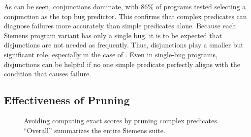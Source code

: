 As can be seen, conjunctions dominate, with 86\% of programs tested selecting a conjunction as the top bug predictor.  This confirms that complex predicates can diagnose failures more accurately than simple predicates alone.  Because each Siemens program variant has only a single bug, it is to be expected that disjunctions are not needed as frequently.  Thus, disjunctions play a smaller but significant role, especially in the case of .  Even in single-bug programs, disjunctions can be helpful if no one simple predicate perfectly aligns with the condition that causes failure.

\subsection{Effectiveness of Pruning}
\label{sec-effectprune}

\begin{figure*}[tb]
  \centering
  \hfill
  \caption{Avoiding computing exact scores by pruning complex predicates.  ``Overall'' summarizes the entire Siemens suite.}
  \label{fig-pruning}
\end{figure*}

